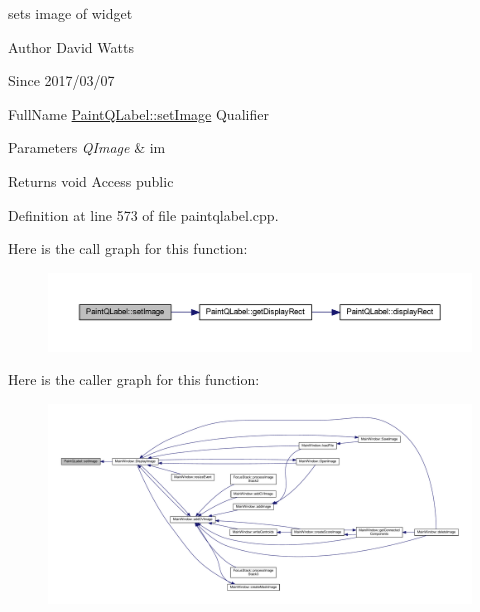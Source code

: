 sets image of widget

\begin{DoxyAuthor}{Author}
David Watts 
\end{DoxyAuthor}
\begin{DoxySince}{Since}
2017/03/07
\end{DoxySince}
Full\+Name \hyperlink{class_paint_q_label_a18ac8d49bd128e0ce565b588a6e8b66a}{Paint\+Q\+Label\+::set\+Image} Qualifier 
\begin{DoxyParams}{Parameters}
{\em Q\+Image} & im \\
\hline
\end{DoxyParams}
\begin{DoxyReturn}{Returns}
void Access public 
\end{DoxyReturn}


Definition at line 573 of file paintqlabel.\+cpp.

Here is the call graph for this function\+:
\nopagebreak
\begin{figure}[H]
\begin{center}
\leavevmode
\includegraphics[width=350pt]{class_paint_q_label_a18ac8d49bd128e0ce565b588a6e8b66a_cgraph}
\end{center}
\end{figure}
Here is the caller graph for this function\+:
\nopagebreak
\begin{figure}[H]
\begin{center}
\leavevmode
\includegraphics[width=350pt]{class_paint_q_label_a18ac8d49bd128e0ce565b588a6e8b66a_icgraph}
\end{center}
\end{figure}
\mbox{\label{class_paint_q_label_a9f76a4b2851a0906aee6738c91c76969}} 
